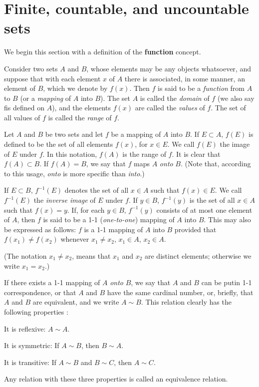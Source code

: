 \section{Finite, countable, and uncountable sets}

We begin this section with a definition of the \textbf{function} concept.
\begin{myDef}
    \label{myDef:2.1}
    Consider two sets $A$ and $B$, whose elements may be any objects whatsoever, and suppose that with each element $x$ of $A$ there is associated, in some manner, an element of $B$, which we denote by $f(x)$. Then $f$ is said to be a \emph{function} from $A$ to $B$ (or a \emph{mapping} of $A$ into $B$). The set $A$ is called the \emph{domain} of $f$ (we also say fis defined on $A$), and the elements $f(x)$ are called the \emph{values} of $f$. The set of all values of $f$ is called the \emph{range} of $f$.
\end{myDef}

\begin{myDef}
    \label{myDef:2.2}
    Let $A$ and $B$ be two sets and let $f$ be a mapping of $A$ into $B$.
    If $E \subset A$, $f(E)$ is defined to be the set of all elements $f(x)$, for $x \in E$. We call $f(E)$ the image of $E$ under $f$. In this notation, $f(A)$ is the range of $f$. It is clear that $f(A) \subset B$. If $f(A) = B$, we say that $f$ maps $A$ \emph{onto} $B$. (Note that, according
    to this usage, \emph{onto} is more specific than \emph{into}.)

    If $E \subset B$, $f^{-1}(E)$ denotes the set of all $x \in A$ such that $f(x)\in E$. We call $f^{-1}(E)$ the \emph{inverse image} of $E$ under $f$. If $y \in B$, $f^{-1}(y)$ is the set of all $x \in A$ such that $f(x) =y$. If, for each $y\in B$, $f^{-1}(y)$ consists of at most one element of $A$, then $f$ is said to be a 1-1 (\emph{one-to-one}) mapping of $A$ into $B$. This may also be expressed as follows: $f$ is a 1-1 mapping of $A$ into $B$ provided that $f(x_1) \neq f(x_2)$ whenever $x_1 \neq x_2$, $x_1 \in A$, $x_2 \in A$.

    (The notation $x_1 \neq x_2$, means that $x_1$ and $x_2$ are distinct elements; otherwise we write $x_1 = x_2$.)
\end{myDef}

\begin{myDef}
    \label{myDef:2.3}
    If there exists a 1-1 mapping of $A$ \emph{onto} $B$, we say that $A$ and $B$ can be putin 1-1 correspondence, or that $A$ and $B$ have the same cardinal number, or, briefly, that $A$ and $B$ are equivalent, and we write $A\sim B$. This relation
    clearly has the following properties :

    It is reflexive: $A\sim A$.

    It is symmetric: If $A\sim B$, then $B\sim A$.

    It is transitive: If $A\sim B$ and $B\sim C$, then $A\sim C$.

    Any relation with these three properties is called an equivalence relation.    
\end{myDef}

